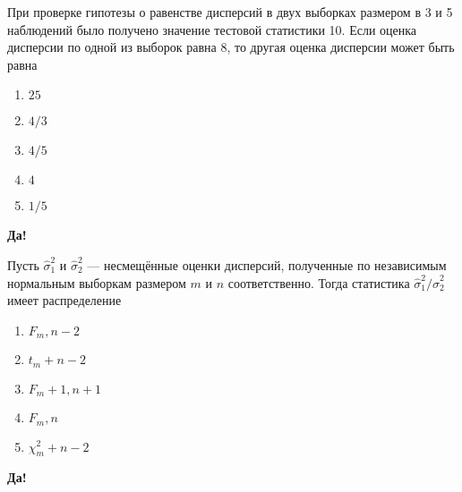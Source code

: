 \documentclass[t]{beamer}
\begin{document}
 \begin{frame} \label{7-Yes} 
\begin{block}{7} 

   При проверке гипотезы о равенстве дисперсий в двух выборках размером в 3 и 5 наблюдений было получено значение тестовой статистики 10. Если оценка дисперсии по одной из выборок равна 8, то другая оценка дисперсии может быть равна


 \end{block} 
\begin{enumerate} 
\item[] \hyperlink{7-No}{\beamergotobutton{} $25$}
\item[] \hyperlink{7-No}{\beamergotobutton{} $4/3$}
\item[] \hyperlink{7-Yes}{\beamergotobutton{} $4/5$}
\item[] \hyperlink{7-No}{\beamergotobutton{} $4$}
\item[] \hyperlink{7-No}{\beamergotobutton{} $1/5$}
\end{enumerate} 

 \textbf{Да!} 
 \hyperlink{8}{}\end{frame} 


 \begin{frame} \label{8-Yes} 
\begin{block}{8} 

  Пусть $\hat\sigma^2_1$ и  $\hat\sigma^2_2$ — несмещённые оценки дисперсий, полученные по независимым нормальным выборкам размером $m$ и $n$ соответственно. Тогда статистика $\hat\sigma^2_1/\hat\sigma^2_2$ имеет распределение


 \end{block} 
\begin{enumerate} 
\item[] \hyperlink{8-No}{\beamergotobutton{} $F_m,n-2$}
\item[] \hyperlink{8-No}{\beamergotobutton{} $t_m+n-2$}
\item[] \hyperlink{8-No}{\beamergotobutton{} $F_m+1, n+1$}
\item[] \hyperlink{8-No}{\beamergotobutton{} $F_m,n$}
\item[] \hyperlink{8-No}{\beamergotobutton{} $\chi^2_m+n-2$}
\end{enumerate} 

 \textbf{Да!} 
 \hyperlink{9}{}\end{frame} 
\end{document}
